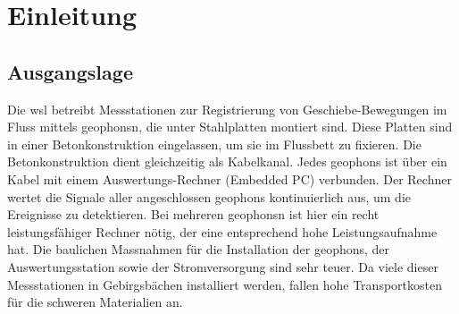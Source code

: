 %
%



\chapter{Einleitung}\label{chap.einleitung}

\section{Ausgangslage}\label{sec.ausgangslage}
Die \gls{wsl} betreibt Messstationen zur Registrierung von Geschiebe-Bewegungen im Fluss mittels \glspl{geophon}n, die unter Stahlplatten montiert sind. Diese Platten sind in einer Betonkonstruktion eingelassen, um sie im Flussbett zu fixieren. Die Betonkonstruktion dient gleichzeitig als Kabelkanal. Jedes \glspl{geophon} ist über ein Kabel mit einem Auswertungs-Rechner (Embedded PC) verbunden. Der Rechner wertet die Signale aller angeschlossen \glspl{geophon} kontinuierlich aus, um die Ereignisse zu detektieren. Bei mehreren \glspl{geophon}n ist hier ein recht leistungsfähiger Rechner nötig, der eine entsprechend hohe Leistungsaufnahme hat. Die baulichen Massnahmen für die Installation der \glspl{geophon}, der Auswertungsstation sowie der Stromversorgung sind sehr teuer. Da viele dieser Messstationen in Gebirgsbächen installiert werden, fallen hohe Transportkosten für die schweren Materialien an.


